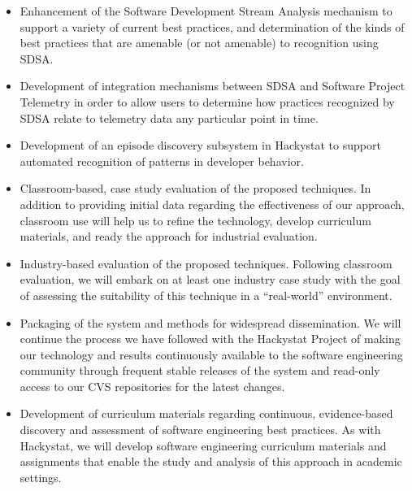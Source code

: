 \begin{itemize}
  
\item Enhancement of the Software Development Stream Analysis mechanism to
  support a variety of current best practices, and determination of the
  kinds of best practices that are amenable (or not amenable) to
  recognition using SDSA.

\item Development of integration mechanisms between SDSA and Software
  Project Telemetry in order to allow users to determine how practices
  recognized by SDSA relate to telemetry data any particular point in time.
  
\item Development of an episode discovery subsystem in Hackystat to support
  automated recognition of patterns in developer behavior.
  
\item Classroom-based, case study evaluation of the proposed techniques. In
  addition to providing initial data regarding the effectiveness of our
  approach, classroom use will help us to refine the technology, develop
  curriculum materials, and ready the approach for industrial evaluation.
  
\item Industry-based evaluation of the proposed techniques. Following
  classroom evaluation, we will embark on at least one industry case study
  with the goal of assessing the suitability of this technique in a
  ``real-world'' environment.
  
\item Packaging of the system and methods for widespread dissemination. We
  will continue the process we have followed with the Hackystat Project of
  making our technology and results continuously available to the software
  engineering community through frequent stable releases of the system and
  read-only access to our CVS repositories for the latest changes.  
  
\item Development of curriculum materials regarding continuous,
  evidence-based discovery and assessment of software engineering best
  practices. As with Hackystat, we will develop software engineering
  curriculum materials and assignments that enable the study and analysis
  of this approach in academic settings.

\end{itemize}






